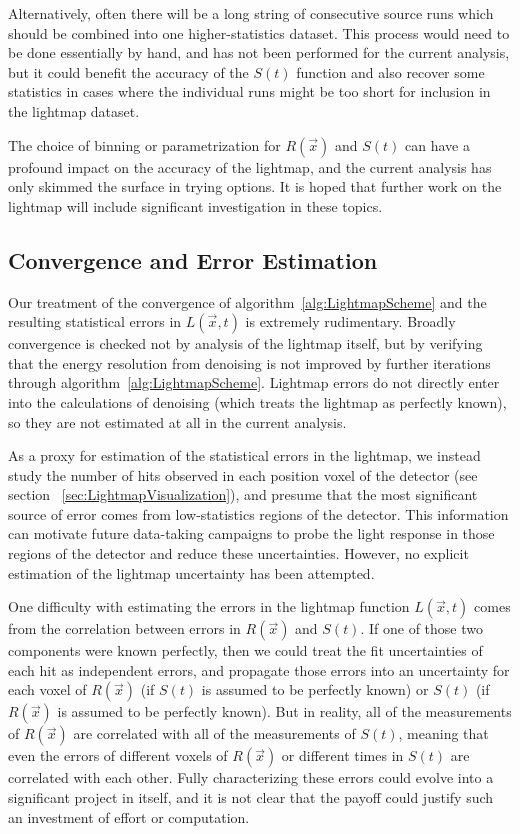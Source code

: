Alternatively, often there will be a long string of consecutive source runs which should be combined into one higher-statistics dataset.  This process would need to be done essentially by hand, and has not been performed for the current analysis, but it could benefit the accuracy of the $S(t)$ function and also recover some statistics in cases where the individual runs might be too short for inclusion in the lightmap dataset.

The choice of binning or parametrization for $R(\vec{x})$ and $S(t)$ can have a profound impact on the accuracy of the lightmap, and the current analysis has only skimmed the surface in trying options.  It is hoped that further work on the lightmap will include significant investigation in these topics.

\subsection{Convergence and Error Estimation}

Our treatment of the convergence of algorithm~\ref{alg:LightmapScheme} and the resulting statistical errors in $L(\vec{x}, t)$ is extremely rudimentary.  Broadly convergence is checked not by analysis of the lightmap itself, but by verifying that the energy resolution from denoising is not improved by further iterations through algorithm~\ref{alg:LightmapScheme}.  Lightmap errors do not directly enter into the calculations of denoising (which treats the lightmap as perfectly known), so they are not estimated at all in the current analysis.

As a proxy for estimation of the statistical errors in the lightmap, we instead study the number of hits observed in each position voxel of the detector (see section ~\ref{sec:LightmapVisualization}), and presume that the most significant source of error comes from low-statistics regions of the detector.  This information can motivate future data-taking campaigns to probe the light response in those regions of the detector and reduce these uncertainties.  However, no explicit estimation of the lightmap uncertainty has been attempted.

One difficulty with estimating the errors in the lightmap function $L(\vec{x},t)$ comes from the correlation between errors in $R(\vec{x})$ and $S(t)$.  If one of those two components were known perfectly, then we could treat the fit uncertainties of each hit as independent errors, and propagate those errors into an uncertainty for each voxel of $R(\vec{x})$ (if $S(t)$ is assumed to be perfectly known) or $S(t)$ (if $R(\vec{x})$ is assumed to be perfectly known).  But in reality, all of the measurements of $R(\vec{x})$ are correlated with all of the measurements of $S(t)$, meaning that even the errors of different voxels of $R(\vec{x})$ or different times in $S(t)$ are correlated with each other.  Fully characterizing these errors could evolve into a significant project in itself, and it is not clear that the payoff could justify such an investment of effort or computation.

